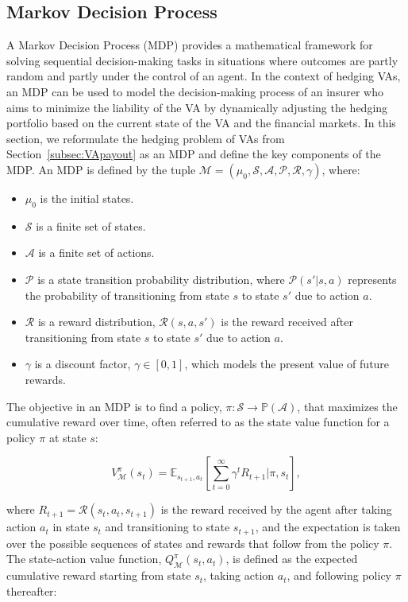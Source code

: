 \subsection{Markov Decision Process}

A Markov Decision Process (MDP) provides a mathematical framework for solving sequential decision-making tasks in situations where outcomes are partly random and partly under the control of an agent. 
In the context of hedging VAs, an MDP can be used to model the decision-making process of an insurer who aims to minimize the liability of the VA by dynamically adjusting the hedging portfolio based on the current state of the VA and the financial markets.
In this section, we reformulate the hedging problem of VAs from Section~\ref{subsec:VApayout} as an MDP and define the key components of the MDP.
An MDP is defined by the tuple $\mathcal{M} = (\mu_0, \mathcal{S}, \mathcal{A}, \mathcal{P}, \mathcal{R}, \gamma)$, where:

\begin{itemize}
    \item $\mu_0$ is the initial states.
    \item $\mathcal{S}$ is a finite set of states.
    \item $\mathcal{A}$ is a finite set of actions.
    \item $\mathcal{P}$ is a state transition probability distribution, where $\mathcal{P}(s'|s, a)$ represents the probability of transitioning from state $s$ to state $s'$ due to action $a$.
    \item $\mathcal{R}$ is a reward distribution, $\mathcal{R}(s, a, s')$ is the reward received after transitioning from state $s$ to state $s'$ due to action $a$.
    \item $\gamma$ is a discount factor, $\gamma \in [0,1]$,  which models the present value of future rewards.
\end{itemize}

The objective in an MDP is to find a policy, $\pi: \mathcal{S} \rightarrow \mathbb{P}(\mathcal{A})$, that maximizes the cumulative reward over time, often referred to as the state value function for a policy $\pi$ at state $s$: 

\begin{equation} \label{eq3:V_pi}
    V^{\pi}_{\mathcal{M}}(s_t) = \mathbb{E}_{s_{t+1}, a_{t}} \left[ \sum_{t=0}^{\infty} \gamma^t R_{t+1} |\pi, s_t \right],
\end{equation}

where $R_{t+1} = \mathcal{R}(s_t, a_t, s_{t+1})$ is the reward received by the agent after taking action $a_t$ in state $s_t$ and transitioning to state $s_{t+1}$, and the expectation is taken over the possible sequences of states and rewards that follow from the policy $\pi$.
The state-action value function, $Q^{\pi}_{\mathcal{M}}(s_t, a_t)$, is defined as the expected cumulative reward starting from state $s_t$, taking action $a_t$, and following policy $\pi$ thereafter:

